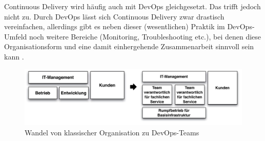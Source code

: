 Continuous Delivery wird häufig auch mit DevOps gleichgesetzt. Das trifft jedoch nicht zu. Durch DevOps lässt sich Continuous Delivery zwar drastisch vereinfachen, allerdings gibt es neben dieser (wesentlichen) Praktik im DevOps-Umfeld noch weitere Bereiche (Monitoring, Troubleshooting etc.), bei denen diese Organisationsform und eine damit einhergehende Zusammenarbeit sinnvoll sein kann \cite{Wolff.2016}.
\begin{figure}[h!]
	\centering
	\includegraphics[width=0.8\linewidth]{images/devops}
	\caption{Wandel von klassischer Organisation zu DevOps-Teams} %
	\label{fig:devops}
\end{figure}
